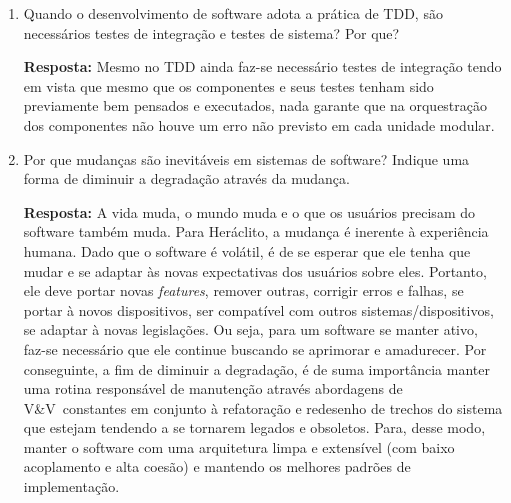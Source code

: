 \documentclass[12pt, a4paper]{article}
\newcommand{\tit}[1]{\textit{#1}}
\newcommand{\tb}[1]{\textbf{#1}}
\newcommand{\ssw}{software }
\newcommand{\vv}{V\&V}
\newcommand{\question}[1]{\item {#1}}
\newcommand{\answer}[1]{\par \tb{Resposta:} #1}
\begin{document}
\begin{enumerate}[label=\textbf{\arabic*.}]
        \question{ Quando o desenvolvimento de software adota a prática de TDD, são necessários testes de integração e testes de sistema? Por que?}
        \answer{ Mesmo no TDD ainda faz-se necessário testes de integração tendo em vista que mesmo que os componentes e seus testes tenham sido previamente bem pensados e executados, nada garante que na orquestração dos componentes não houve um erro não previsto em cada unidade modular.
        }
        
        \question{Por que mudanças são inevitáveis em sistemas de software? Indique uma forma de diminuir a degradação através da mudança.}
        \answer{A vida muda, o mundo muda e o que os usuários precisam do \ssw também muda. Para Heráclito, a mudança é inerente à experiência humana. Dado que o \ssw é volátil, é de se esperar que ele tenha que mudar e se adaptar às novas expectativas dos usuários sobre eles. Portanto, ele deve portar novas \tit{features}, remover outras, corrigir erros e falhas, se portar à novos dispositivos, ser compatível com outros sistemas/dispositivos, se adaptar à novas legislações. Ou seja, para um \ssw se manter ativo, faz-se necessário que ele continue buscando se aprimorar e amadurecer. Por conseguinte,  a fim de diminuir a degradação, é de suma importância manter uma rotina responsável de manutenção através abordagens de \vv \ constantes em conjunto à refatoração e redesenho de trechos do sistema que estejam tendendo a se tornarem legados e obsoletos. Para, desse modo, manter o \ssw com uma arquitetura limpa e extensível (com baixo acoplamento e alta coesão) e mantendo os melhores padrões de implementação.
        }     
    
    \end{enumerate}
        
    
\end{document}
